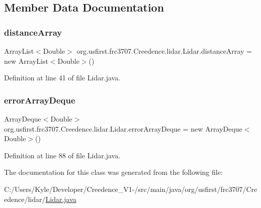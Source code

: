 \subsection{Member Data Documentation}
\mbox{\label{classorg_1_1usfirst_1_1frc3707_1_1_creedence_1_1lidar_1_1_lidar_a4914c30ec8db9aa139a37e0e7531d984}} 
\subsubsection{\texorpdfstring{distanceArray}{distanceArray}}
{\footnotesize\ttfamily Array\+List$<$Double$>$ org.\+usfirst.\+frc3707.\+Creedence.\+lidar.\+Lidar.\+distance\+Array = new Array\+List$<$Double$>$()}



Definition at line 41 of file Lidar.\+java.

\mbox{\label{classorg_1_1usfirst_1_1frc3707_1_1_creedence_1_1lidar_1_1_lidar_a19af3c419d37e586077229caa597ae7d}} 
\subsubsection{\texorpdfstring{errorArrayDeque}{errorArrayDeque}}
{\footnotesize\ttfamily Array\+Deque$<$Double$>$ org.\+usfirst.\+frc3707.\+Creedence.\+lidar.\+Lidar.\+error\+Array\+Deque = new Array\+Deque$<$Double$>$()}



Definition at line 88 of file Lidar.\+java.



The documentation for this class was generated from the following file\+:\begin{DoxyCompactItemize}
\item 
C\+:/\+Users/\+Kyle/\+Developer/\+Creedence\+\_\+\+V1-\//src/main/java/org/usfirst/frc3707/\+Creedence/lidar/\mbox{\hyperlink{_lidar_8java}{Lidar.\+java}}\end{DoxyCompactItemize}
